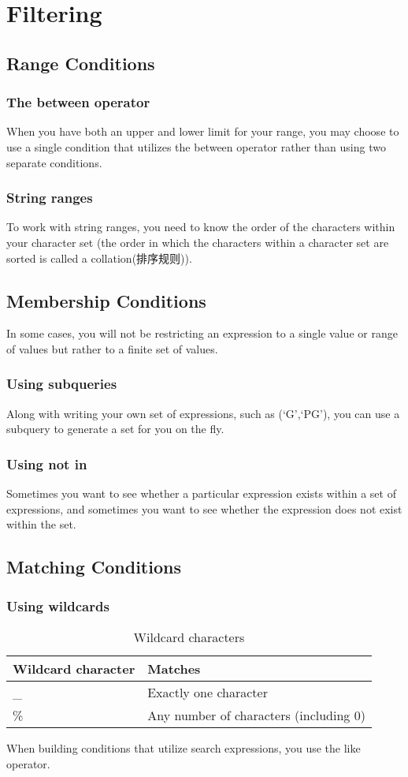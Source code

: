 \chapter{Filtering\label{Ch04}}
\section{Range Conditions}
\subsection*{The between operator}
When you have both an upper and lower limit for your range, you may choose to use a single condition that utilizes the between operator rather than using two separate conditions.

\subsection*{String ranges}
To work with string ranges, you need to know the order of the characters within your character set (the order in which the characters within a character set are sorted is called a collation(排序规则)).
\section{Membership Conditions}
In some cases, you will not be restricting an expression to a single value or range of values but rather to a finite set of values.

\subsection*{Using subqueries}
Along with writing your own set of expressions, such as (`G',`PG'), you can use a subquery to generate a set for you on the fly.
\subsection*{Using not in}
Sometimes you want to see whether a particular expression exists within a set of expressions, and sometimes you want to see whether the expression does not exist within the set.
\section{Matching Conditions}
\subsection*{Using wildcards}
\begin{table}
    \centering
    \caption{Wildcard characters}
    \begin{tabular}{ll}
        \hline
        Wildcard character & Matches                                \\
        \hline
        \_                 & Exactly one character                  \\
        \%                 & Any number of characters (including 0) \\
        \hline
    \end{tabular}
\end{table}
When building conditions that utilize search expressions, you use the like operator.

